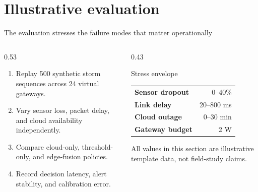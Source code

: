 \section{Illustrative evaluation}

\begin{frame}{The evaluation stresses the failure modes that matter operationally}
  \begin{columns}[T,onlytextwidth]
    \begin{column}{0.53\textwidth}
      \begin{enumerate}
        \item Replay 500 synthetic storm sequences across 24 virtual gateways.
        \item Vary sensor loss, packet delay, and cloud availability independently.
        \item Compare cloud-only, threshold-only, and edge-fusion policies.
        \item Record decision latency, alert stability, and calibration error.
      \end{enumerate}
    \end{column}
    \begin{column}{0.43\textwidth}
      \begin{block}{Stress envelope}
        \begin{tabular}{@{}>{\bfseries}l r@{}}
          \toprule
          Sensor dropout & 0--40\% \\
          Link delay & 20--800 ms \\
          Cloud outage & 0--30 min \\
          Gateway budget & 2 W \\
          \bottomrule
        \end{tabular}
      \end{block}
      \vspace{0.2cm}
      \scriptsize\color{AstraInk!75}
      All values in this section are illustrative template data, not field-study claims.
    \end{column}
  \end{columns}
\end{frame}

